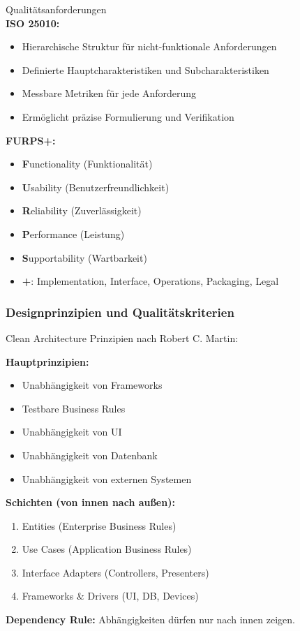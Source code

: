\begin{theorem}{Qualitätsanforderungen}\\
\textbf{ISO 25010:}
\begin{itemize}
    \item Hierarchische Struktur für nicht-funktionale Anforderungen
    \item Definierte Hauptcharakteristiken und Subcharakteristiken
    \item Messbare Metriken für jede Anforderung
    \item Ermöglicht präzise Formulierung und Verifikation
\end{itemize}

\textbf{FURPS+:}
\begin{itemize}
    \item \textbf{F}unctionality (Funktionalität)
    \item \textbf{U}sability (Benutzerfreundlichkeit)
    \item \textbf{R}eliability (Zuverlässigkeit)
    \item \textbf{P}erformance (Leistung)
    \item \textbf{S}upportability (Wartbarkeit)
    \item \textbf{+}: Implementation, Interface, Operations, Packaging, Legal
\end{itemize}
\end{theorem}

\pagebreak

\subsubsection{Designprinzipien und Qualitätskriterien}

\begin{KR}{Clean Architecture}
Prinzipien nach Robert C. Martin:

\textbf{Hauptprinzipien:}
\begin{itemize}
    \item Unabhängigkeit von Frameworks
    \item Testbare Business Rules
    \item Unabhängigkeit von UI
    \item Unabhängigkeit von Datenbank
    \item Unabhängigkeit von externen Systemen
\end{itemize}

\textbf{Schichten (von innen nach außen):}
\begin{enumerate}
    \item Entities (Enterprise Business Rules)
    \item Use Cases (Application Business Rules)
    \item Interface Adapters (Controllers, Presenters)
    \item Frameworks \& Drivers (UI, DB, Devices)
\end{enumerate}

\textbf{Dependency Rule:}
Abhängigkeiten dürfen nur nach innen zeigen.
\end{KR}

